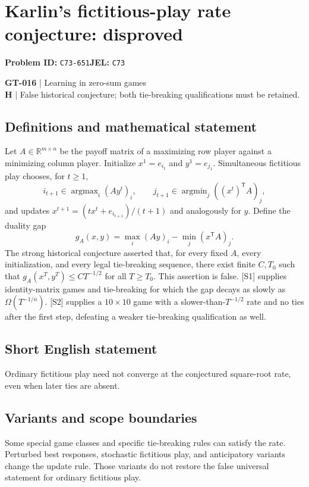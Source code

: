 \documentclass[11pt,a4paper]{article}
\begin{document}
\section*{Karlin's fictitious-play rate conjecture: disproved}
\textbf{Problem ID:} \texttt{C73-651}\quad \textbf{JEL:} \texttt{C73}\par
\label{problem:OP-0146}
\label{game:GT-016}
{\sffamily\small\color{muted}
\textbf{GT-016} | Learning in zero-sum games\\
\textbf{H} | False historical conjecture; both tie-breaking qualifications must be retained.
\par}
\subsection*{Definitions and mathematical statement}
Let $A\in\mathbb R^{m\times n}$ be the payoff matrix of a maximizing row player against a minimizing column player. Initialize $x^1=e_{i_1}$ and $y^1=e_{j_1}$. Simultaneous fictitious play chooses, for $t\geq1$,
\[
 i_{t+1}\in\operatorname{argmax}_i(Ay^t)_i,\qquad
 j_{t+1}\in\operatorname{argmin}_j((x^t)^{\mathsf T}A)_j,
\]
and updates $x^{t+1}=(tx^t+e_{i_{t+1}})/(t+1)$ and analogously for $y$. Define the duality gap
\[
 g_A(x,y)=\max_i(Ay)_i-\min_j(x^{\mathsf T}A)_j.
\]
The strong historical conjecture asserted that, for every fixed $A$, every initialization, and every legal tie-breaking sequence, there exist finite $C,T_0$ such that $g_A(x^T,y^T)\leq CT^{-1/2}$ for all $T\geq T_0$. This assertion is false. [S1] supplies identity-matrix games and tie-breaking for which the gap decays as slowly as $\Omega(T^{-1/n})$. [S2] supplies a $10\times10$ game with a slower-than-$T^{-1/2}$ rate and no ties after the first step, defeating a weaker tie-breaking qualification as well.
\subsection*{Short English statement}
Ordinary fictitious play need not converge at the conjectured square-root rate, even when later ties are absent.
\subsection*{Variants and scope boundaries}
Some special game classes and specific tie-breaking rules can satisfy the rate. Perturbed best responses, stochastic fictitious play, and anticipatory variants change the update rule. Those variants do not restore the false universal statement for ordinary fictitious play.
\end{document}

